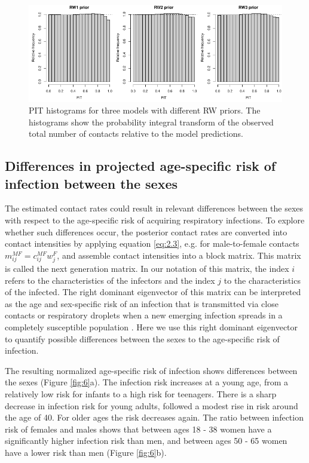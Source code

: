 \documentclass[aoas,preprint]{imsart}
\numberwithin{equation}{section}
\begin{document}
\begin{figure}
\centering
\includegraphics{fig_pit.pdf}
\caption{PIT histograms for three models with different RW priors. The histograms show the probability integral transform of the observed total number of contacts relative to the model predictions.} \label{fig:5}
\end{figure}

\subsection{Differences in projected age-specific risk of infection between the sexes}

The estimated contact rates could result in relevant differences between the sexes with respect to the age-specific risk of acquiring respiratory infections. To explore whether such differences occur, the posterior contact rates are converted into contact intensities by applying equation \ref{eq:2.3}, e.g. for male-to-female contacts $m_\textit{ij}^\textit{MF} = c_\textit{ij}^\textit{MF} w_j^F$, and assemble contact intensities into a block matrix. This matrix is called the next generation matrix. In our notation of this matrix, the index $i$ refers to the characteristics of the infectors and the index $j$ to the characteristics of the infected. The right dominant eigenvector of this matrix can be interpreted as the age and sex-specific risk of an infection that is transmitted via close contacts or respiratory droplets when a new emerging infection spreads in a completely susceptible population \citep{wallinga_optimizing_2010}. Here we use this right dominant eigenvector to quantify possible differences between the sexes to the age-specific risk of infection.

The resulting normalized age-specific risk of infection shows differences between the sexes (Figure \ref{fig:6}a). The infection risk increases at a young age, from a relatively low risk for infants to a high risk for teenagers. There is a sharp decrease in infection risk for young adults, followed a modest rise in risk around the age of 40. For older ages the risk decreases again. The ratio between infection risk of females and males shows that between ages 18 - 38 women have a significantly higher infection risk than men, and between ages 50 - 65 women have a lower risk than men (Figure \ref{fig:6}b).
\end{document}
